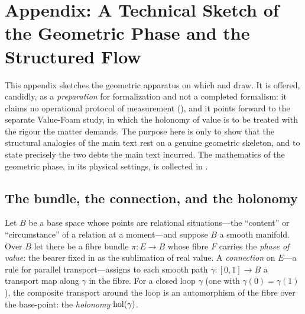 \appendix
\section{Appendix: A Technical Sketch of the Geometric Phase and the Structured Flow}
\label{p09:sec:appendix}

\noindent
This appendix sketches the geometric apparatus on which  and  draw. It is offered, candidly, as a \emph{preparation} for formalization and not a completed formalism: it claims no operational protocol of measurement (), and it points forward to the separate Value-Foam study, in which the holonomy of value is to be treated with the rigour the matter demands. The purpose here is only to show that the structural analogies of the main text rest on a genuine geometric skeleton, and to state precisely the two debts the main text incurred. The mathematics of the geometric phase, in its physical settings, is collected in \textcite{shapere1989}.

\subsection{The bundle, the connection, and the holonomy}
\label{p09:sec:app-bundle}

Let $B$ be a base space whose points are relational situations---the ``content'' or ``circumstance'' of a relation at a moment---and suppose $B$ a smooth manifold. Over $B$ let there be a fibre bundle $\pi : E \to B$ whose fibre $F$ carries the \emph{phase of value}: the bearer fixed in  as the sublimation of real value. A \emph{connection} on $E$---a rule for parallel transport---assigns to each smooth path $\gamma : [0,1] \to B$ a transport map along $\gamma$ in the fibre. For a closed loop $\gamma$ (one with $\gamma(0)=\gamma(1)$), the composite transport around the loop is an automorphism of the fibre over the base-point: the \emph{holonomy} $\operatorname{hol}(\gamma)$. 

